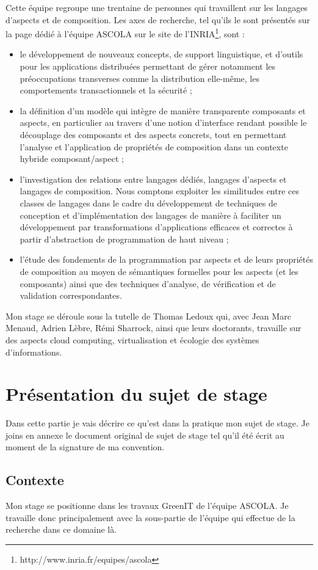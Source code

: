 \documentclass[a4paper, 11pt]{report}
\begin{document}
Cette équipe regroupe une trentaine de personnes qui travaillent sur les langages d'aspects et de composition. Les axes de recherche, tel qu'ils le sont présentés sur la page dédié à l'équipe ASCOLA sur le site de l'INRIA\footnote{http://www.inria.fr/equipes/ascola}, sont :
\begin{itemize}
	\item le développement de nouveaux concepts, de support linguistique, et d'outils pour les applications distribuées permettant de gérer notamment les préoccupations transverses comme la distribution elle-même, les comportements transactionnels et la sécurité ;
	\item la définition d'un modèle qui intègre de manière transparente composants et aspects, en particulier au travers d'une notion d'interface rendant possible le découplage des composants et des aspects concrets, tout en permettant l'analyse et l'application de propriétés de composition dans un contexte hybride composant/aspect ;
	\item l'investigation des relations entre langages dédiés, langages d'aspects et langages de composition. Nous comptons exploiter les similitudes entre ces classes de langages dans le cadre du développement de techniques de conception et d'implémentation des langages de manière à faciliter un développement par transformations d'applications efficaces et correctes à partir d'abstraction de programmation de haut niveau ;
	\item l'étude des fondements de la programmation par aspects et de leurs propriétés de composition au moyen de sémantiques formelles pour les aspects (et les composants) ainsi que des techniques d'analyse, de vérification et de validation correspondantes.
\end{itemize}

Mon stage se déroule sous la tutelle de Thomas Ledoux qui, avec Jean Marc Menaud, Adrien Lèbre, Rémi Sharrock, ainsi que leurs doctorants, travaille sur des aspects cloud computing, virtualisation et écologie des systèmes d'informations.

\section{Présentation du sujet de stage}
Dans cette partie je vais décrire ce qu'est dans la pratique mon sujet de stage. Je joins en annexe le document original de sujet de stage tel qu'il été écrit au moment de la signature de ma convention.

\subsection{Contexte}
Mon stage se positionne dans les travaux GreenIT de l’équipe ASCOLA. Je travaille donc principalement avec la sous-partie de l'équipe qui effectue de la recherche dans ce domaine là.
\end{document}
